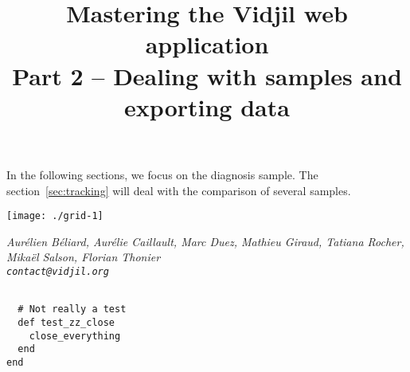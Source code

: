 \documentclass[11pt]{article}
\begin{document}
In the following sections, we focus on the diagnosis sample.
The section~\ref{sec:tracking} will deal with the comparison of several samples. 







\bigskip

\bigskip

\centerline{\texttt{[image: ./grid-1]}}

\newpage

\title{Mastering the Vidjil web application \\[1ex] Part 2 -- Dealing with
  samples and exporting data
}
\maketitle






\vfill
\flushright \it Aurélien Béliard, Aurélie Caillault, Marc Duez, Mathieu Giraud, Tatiana Rocher, Mikaël Salson, Florian Thonier
\\ \texttt{contact@vidjil.org}


\begin{verbatim}

  # Not really a test
  def test_zz_close
    close_everything
  end
end
\end{verbatim}
\end{document}
